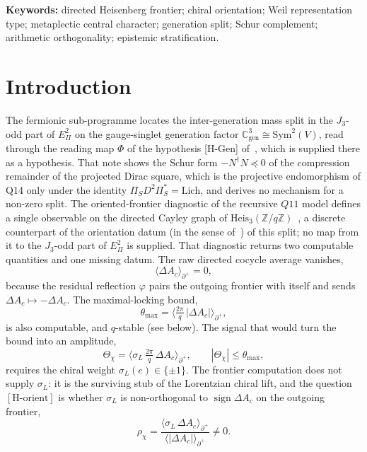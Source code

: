 \documentclass[11pt]{article}
\theoremstyle{plain}
\theoremstyle{remark}
\newcommand{\Zq}{\mathbb{Z}/q\mathbb{Z}}
\newcommand{\dac}{\Delta A_c}
\newcommand{\rhochi}{\rho_\chi}
\newcommand{\thmax}{\theta_{\max}}
\newcommand{\EPi}{E_\Pi}
\newcommand{\PiS}{\Pi_S}
\newcommand{\sgn}{\operatorname{sign}}
\newcommand{\Horient}{[\mathrm{H\text{-}orient}]}
\begin{document}
  \noindent\textbf{Keywords:} directed Heisenberg frontier; chiral orientation; Weil representation type; metaplectic
  central character; generation split; Schur complement; arithmetic orthogonality; epistemic stratification.

  \newpage
  \tableofcontents

  \newpage
  \section{Introduction}

    The fermionic sub-programme locates the inter-generation mass split in the $J_3$-odd part of $\EPi^2$ on the
    gauge-singlet generation factor $\mathbb{C}^3_{\mathrm{gen}} \cong \mathrm{Sym}^2(V)$, read through the reading
    map $\Phi$ of the hypothesis [H-Gen] of~\cite{Beau2026prs}, which is supplied there as a hypothesis.
    That note shows the Schur form $-N^\dagger N\preceq0$ of the compression remainder of the projected Dirac square,
    which is the projective endomorphism of Q14 only under the identity $\PiS D^2\PiS^*=\mathrm{Lich}$, and derives no
    mechanism for a non-zero split.
    The oriented-frontier diagnostic of the recursive $Q11$ model defines a single observable on the directed Cayley
    graph of $\mathrm{Heis}_3(\Zq)$~\cite{Beau2026q11of}, a discrete counterpart of the orientation datum (in the sense of~\cite{Beau2026q11of}) of this
    split; no map from it to the $J_3$-odd part of $\EPi^2$ is supplied.
    That diagnostic returns two computable quantities and one missing datum.
    The raw directed cocycle average vanishes,
    \begin{equation}
      \langle \dac \rangle_{\partial^+} = 0,
    \end{equation}
    because the residual reflection $\varphi$ pairs the outgoing frontier with itself and sends $\dac\mapsto -\dac$.
    The maximal-locking bound,
    \begin{equation}
      \thmax = \Big\langle \tfrac{2\pi}{q}\,|\dac| \Big\rangle_{\partial^+},
    \end{equation}
    is also computable, and $q$-stable (see below).
    The signal that would turn the bound into an amplitude,
    \begin{equation}
      \Theta_\chi = \Big\langle \sigma_L\,\tfrac{2\pi}{q}\,\dac \Big\rangle_{\partial^+},
      \qquad |\Theta_\chi| \le \thmax,
    \end{equation}
    requires the chiral weight $\sigma_L(e)\in\{\pm 1\}$.
    The frontier computation does not supply $\sigma_L$: it is the surviving stub of the Lorentzian chiral lift, and the
    question $\Horient$ is whether $\sigma_L$ is non-orthogonal to $\sgn\dac$ on the outgoing frontier,
    \begin{equation}
      \rhochi = \frac{\langle \sigma_L\,\dac\rangle_{\partial^+}}{\langle |\dac|\rangle_{\partial^+}}\neq 0.
    \end{equation}
\end{document}

